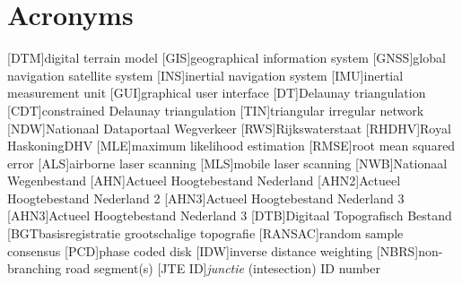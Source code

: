 \chapter*{Acronyms}

\begin{acronym}[UML]
  [DTM]{digital terrain model}
  [GIS]{geographical information system}
  [GNSS]{global navigation satellite system}
  [INS]{inertial navigation system}
  [IMU]{inertial measurement unit}
  [GUI]{graphical user interface}
  [DT]{Delaunay triangulation}
  [CDT]{constrained Delaunay triangulation}
  [TIN]{triangular irregular network}
  [NDW]{Nationaal Dataportaal Wegverkeer}
  [RWS]{Rijkswaterstaat}
  [RHDHV]{Royal HaskoningDHV}
  [MLE]{maximum likelihood estimation}
  [RMSE]{root mean squared error}
  [ALS]{airborne laser scanning}
  [MLS]{mobile laser scanning}
  [NWB]{Nationaal Wegenbestand}
  [AHN]{Actueel Hoogtebestand Nederland}
  [AHN2]{Actueel Hoogtebestand Nederland 2}
  [AHN3]{Actueel Hoogtebestand Nederland 3}
  [AHN3]{Actueel Hoogtebestand Nederland 3}
  [DTB]{Digitaal Topografisch Bestand}
  [BGT{basisregistratie grootschalige topografie}
  [RANSAC]{random sample consensus}
  [PCD]{phase coded disk}
  [IDW]{inverse distance weighting}
  [NBRS]{non-branching road segment(s)}
  [JTE ID]{\textit{junctie} (intesection) ID number}
\end{acronym}